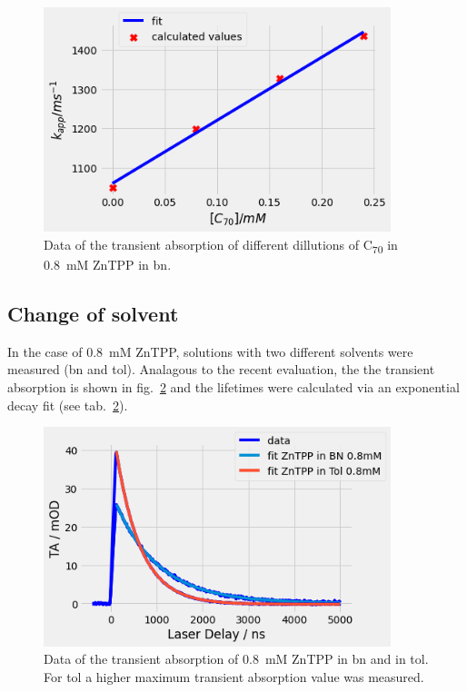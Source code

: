 \begin{figure}[h]
    \centering
    \includegraphics[width = 0.9\textwidth]{Bilder/Auswertung/TRAS/ZnTPP-C70-kq.png}
    \caption{Data of the transient absorption of different dillutions of C\textsubscript{70} in \SI{0.8}{\milli\nauticalmile} ZnTPP in bn.}
    \label{fig:C70-kq}
\end{figure}


\subsection*{Change of solvent}

In the case of \SI{0.8}{\milli\nauticalmile} ZnTPP, solutions with two different solvents were measured (bn and tol). Analagous to the recent evaluation, the the transient absorption is shown in fig.~\ref{fig:ZnTPP-bn-tol} and the lifetimes were calculated via an exponential decay fit (see tab.~\ref{fig:ZnTPP-bn-tol}).

\begin{figure}[h]
    \centering
    \includegraphics[width = 0.9\textwidth]{Bilder/Auswertung/TRAS/ZnTPP-bn-tol.png}
    \caption{Data of the transient absorption of \SI{0.8}{\milli\nauticalmile} ZnTPP in bn and in tol. For tol a higher maximum transient absorption value was measured.}
    \label{fig:ZnTPP-bn-tol}
\end{figure}


